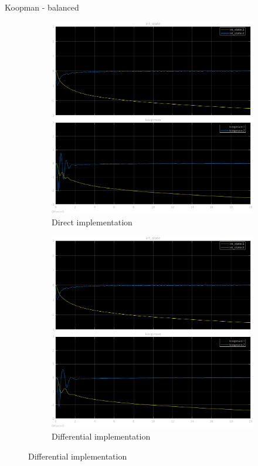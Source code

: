 \documentclass{beamer}
\begin{document}
\begin{frame}{Koopman - balanced}
    \begin{figure}
        \centering
        \begin{subfigure}[b]{0.45\textwidth}
            \centering
            \includegraphics[width=\textwidth]{balanced_koopman_direct.png}
            \caption{Direct implementation}
        \end{subfigure}
        \hfill
        \begin{subfigure}[b]{0.45\textwidth}
            \centering
            \includegraphics[width=\textwidth]{balanced_koopman_differential.png}
            \caption{Differential implementation}
        \end{subfigure}
    \end{figure}
\end{frame}
\end{document}
